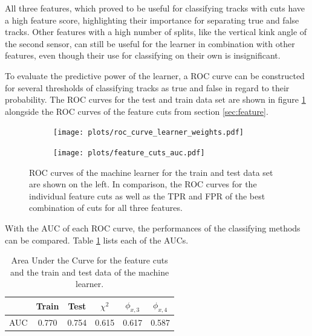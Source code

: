 All three features, which proved to be useful for classifying tracks with cuts have a high feature score, highlighting their importance for separating true and false tracks.
Other features with a high number of splits, like the vertical kink angle of the second sensor, can still be useful for the learner in combination with other features, even though
their use for classifying on their own is insignificant.

To evaluate the predictive power of the learner, a ROC curve can be constructed for several thresholds of classifying tracks as true and false in regard to
their probability. The ROC curves for the test and train data set are shown in figure \ref{fig:auc_comparison} alongside the ROC curves of the feature cuts from section \ref{sec:feature}.


\begin{figure}
  \hspace{-1cm}
  \begin{subfigure}{0.53\textwidth}
      \centering
      \texttt{[image: plots/roc\_curve\_learner\_weights.pdf]}
  \end{subfigure}
  \begin{subfigure}{0.53\textwidth}
      \texttt{[image: plots/feature\_cuts\_auc.pdf]}
  \end{subfigure}
  \caption{ROC curves of the machine learner for the train and test data set are shown on the left. In comparison, the ROC curves for the individual feature cuts as well as the
  TPR and FPR of the best combination of cuts for all three features.}
  \label{fig:auc_comparison}
\end{figure}

With the AUC of each ROC curve, the performances of the classifying methods can be compared. Table \ref{tab:AUC} lists each of the AUCs.

\begin{table}
  \centering
  \begin{tabular}{c | c c c c c}
    \toprule
      & Train & Test & $\chi^2$ & $\phi_{x,3}$ & $\phi_{x,4}$\\
    \midrule
    AUC & 0.770 & 0.754 & 0.615 & 0.617 & 0.587 \\
  \end{tabular}
  \caption{Area Under the Curve for the feature cuts and the train and test data of the machine learner.}
  \label{tab:AUC}
\end{table}

